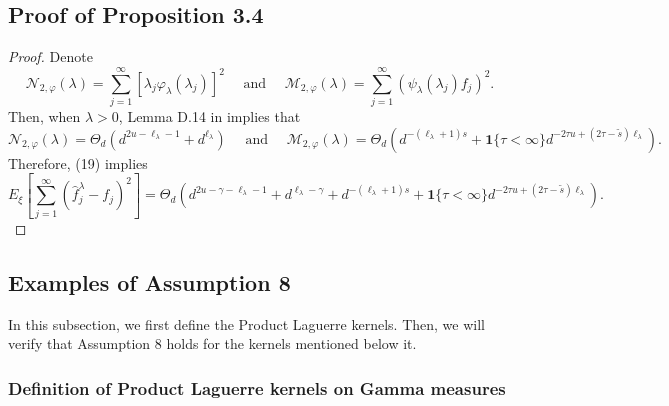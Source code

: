 \documentclass{article}
\theoremstyle{plain}
\theoremstyle{definition}
\theoremstyle{remark}
\newcommand{\reg}{\varphi_\lambda}
\newcommand{\rem}{\psi_\lambda}
\begin{document}
\begin{appendix}
\subsection{Proof of Proposition 3.4}
\begin{proof}
Denote
$$
\mathcal{N}_{2, \varphi}(\lambda) = \sum_{j =1}^\infty \left[ \lambda_j \reg(\lambda_j) \right]^2
\quad \text{ and } \quad
\mathcal{M}_{2, \varphi}(\lambda) = \sum\limits_{j=1}^{\infty} \left( \rem(\lambda_j) f_{j}\right)^{2}.
$$
Then, when $\lambda > 0$, Lemma D.14 in \cite{lu2024saturation} implies that
$$
\mathcal{N}_{2, \varphi}(\lambda) = \Theta_{d} \left( 
d^{2u - \ell_{\lambda} - 1}
+ d^{\ell_{\lambda}}
\right)
\quad \text{ and } \quad
\mathcal{M}_{2, \varphi}(\lambda) = \Theta_{d} \left( 
d^{-(\ell_{\lambda} + 1)  s}
+ \mathbf{1}\{\tau<\infty\} d^{-2  \tau  u + (2  \tau - \tilde{s})  \ell_{\lambda}}
\right).
$$
Therefore, (19) implies
$$
E_{\xi}\left[\sum_{j=1}^{\infty}(\hat{f}_j^{\lambda} - f_j)^2\right]
= 
\Theta_{d} \left( 
d^{2u - \gamma - \ell_{\lambda} - 1}
+ d^{\ell_{\lambda} - \gamma}
+ d^{-(\ell_{\lambda} + 1)  s}
+ \mathbf{1}\{\tau<\infty\} d^{-2  \tau  u + (2  \tau - \tilde{s})  \ell_{\lambda}}
\right).
$$

\end{proof}


\subsection{Examples of Assumption 8}\label{appendix_kernel_satisfy_assump_eigenval_general}

In this subsection, we first define the Product Laguerre kernels. Then, we will verify that Assumption 8 holds for the kernels mentioned below it.


\subsubsection{Definition of Product Laguerre kernels on Gamma measures}\label{appendix_Laguerre_polynomials}


\end{appendix}
\end{document}
